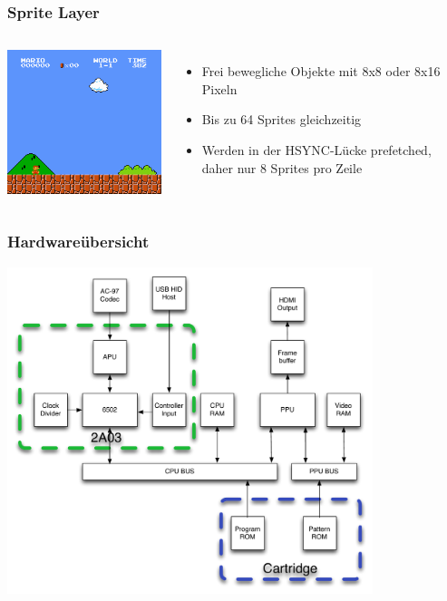 \documentclass{beamer}
\begin{document}
    \begin{frame}
        \frametitle{Sprite Layer}
        \begin{columns}
                 \includegraphics[width=1.1\textwidth]{img/smb_sprite.png}                
                \begin{itemize}
                        \item{Frei bewegliche Objekte mit 8x8 oder 8x16 Pixeln}
                        \item{Bis zu 64 Sprites gleichzeitig}
                        \item{Werden in der HSYNC-Lücke prefetched, daher nur 8 Sprites pro Zeile}
                \end{itemize}
        \end{columns}
    \end{frame}
    
    
    \begin{frame}
        \frametitle{Hardwareübersicht}
        \includegraphics[width=0.8\textwidth]{img/system2.pdf}
    \end{frame}
    
\end{document}
